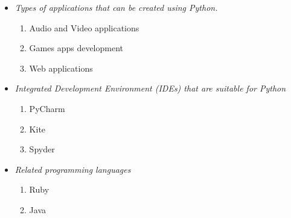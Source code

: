 \documentclass{article}
\begin{document}
	
	\begin{itemize}
		\item \textit{Types of applications that can be created using Python.}
		\begin{enumerate}
			\item Audio and Video applications
			\item Games apps development
			\item Web applications
		\end{enumerate}
	\item \textit{Integrated Development Environment (IDEs) that are suitable for Python}
	\begin{enumerate}
		\item PyCharm
		\item Kite
		\item Spyder
	\end{enumerate}
    \item \textit{Related programming languages}
    \begin{enumerate}
    	\item Ruby
    	\item Java
    \end{enumerate}
	\end{itemize}
\end{document}
